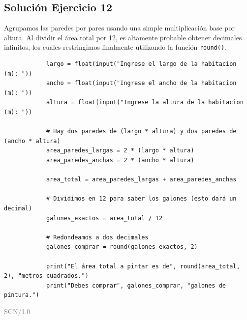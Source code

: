 \documentclass[11pt, a4paper]{article}
\begin{document}
	\subsection*{Solución Ejercicio 12}
	\begin{solucion}
		Agrupamos las paredes por pares usando una simple multiplicación base por altura. Al dividir el área total por 12, es altamente probable obtener decimales infinitos, los cuales restringimos finalmente utilizando la función \texttt{round()}.
		
		\begin{lstlisting}
			largo = float(input("Ingrese el largo de la habitacion (m): "))
			ancho = float(input("Ingrese el ancho de la habitacion (m): "))
			altura = float(input("Ingrese la altura de la habitacion (m): "))
			
			# Hay dos paredes de (largo * altura) y dos paredes de (ancho * altura)
			area_paredes_largas = 2 * (largo * altura)
			area_paredes_anchas = 2 * (ancho * altura)
			
			area_total = area_paredes_largas + area_paredes_anchas
			
			# Dividimos en 12 para saber los galones (esto dará un decimal)
			galones_exactos = area_total / 12
			
			# Redondeamos a dos decimales
			galones_comprar = round(galones_exactos, 2)
			
			print("El área total a pintar es de", round(area_total, 2), "metros cuadrados.")
			print("Debes comprar", galones_comprar, "galones de pintura.")
		\end{lstlisting}
	\end{solucion}

	\vfill
	\hfill \textcolor{gray}{SCN/1.0}
\end{document}
